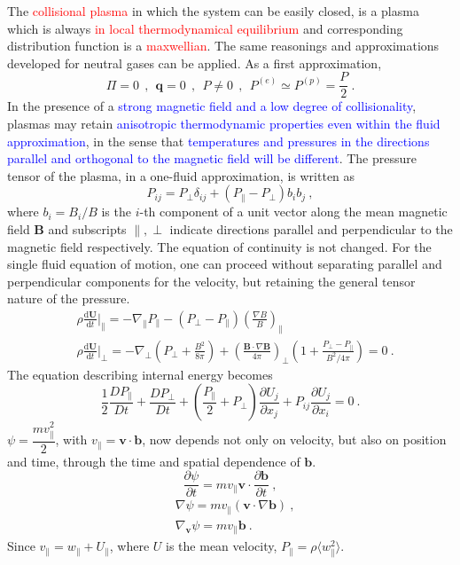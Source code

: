\documentclass[12pt,a4paper]{article}
\renewcommand{\vec}[1]{\boldsymbol{#1}}
\newcommand{\dif}{\mathrm{d}}
\begin{document}
The \textcolor{red}{collisional plasma} in which the system can be easily closed, is a plasma which is always \textcolor{red}{in local thermodynamical equilibrium} and corresponding distribution function is a \textcolor{red}{maxwellian}.  The same reasonings and approximations developed for neutral gases can be applied. As a first approximation, 
\begin{equation*}
\Pi   = 0 ~~ , ~~ \vec{q}  = 0 ~~, ~~ P \neq 0 ~~, ~~ P^{(e)} \simeq P^{(p)} = \frac{P}{2} ~.
\end{equation*}
In the presence of a \textcolor{blue}{strong magnetic field and a low degree of collisionality}, plasmas may retain \textcolor{blue}{anisotropic thermodynamic properties even within the fluid approximation}, in the sense that \textcolor{blue}{temperatures and pressures in the directions parallel and orthogonal to the magnetic field will be different}.  The pressure tensor of the plasma, in a one-fluid approximation, is written as
\begin{equation*}
P_{ij} = P_\perp \delta_{ij} +(P_\parallel -P_\perp) b_i b_j ~,
\end{equation*}
where $b_i = B_i /B$  is the $i$-th component of a unit vector along the mean magnetic field $\vec{B}$ and subscripts $\parallel, \perp$ indicate directions parallel and perpendicular to the magnetic field respectively. The equation of continuity is not changed. For the single fluid equation of motion, one can proceed without separating parallel and perpendicular components for the velocity, but retaining the general tensor nature of the pressure.
\begin{align*}
& \rho \frac{\dif \vec{U}}{\dif t}\Bigg|_\parallel = -\nabla_\parallel P_\parallel -(P_\perp -P_\parallel) \left(\frac{\nabla B}{B} \right)_\parallel \\
& \rho \frac{\dif \vec{U}}{\dif t}\Bigg|_\perp = -\nabla_\perp \left( P_\perp +\frac{B^2}{8\pi} \right) +\left(\frac{\vec{B}\cdot \nabla \vec{B}}{4\pi} \right)_\perp \left(1 +\frac{P_\perp -P_\parallel}{B^2/4\pi} \right) = 0 ~.
\end{align*}
The equation describing internal energy becomes
\begin{equation}
\frac{1}{2} \dfrac{D P_\parallel}{D t} +\dfrac{D P_\perp}{D t} +\left(\frac{P_\parallel}{2} +P_\perp \right) \frac{\partial U_j}{\partial x_j} +P_{ij} \frac{\partial U_j}{\partial x_i} = 0 ~.
\end{equation}
$\psi = \dfrac{m v^2_\parallel}{2}$, with $v_\parallel = \vec{v} \cdot \vec{b}$, now depends not only on velocity, but also on position and time, through the time and spatial dependence of $\vec{b}$. 
\begin{equation*}
\frac{\partial \psi}{\partial t} = m v_\parallel \vec{v} \cdot \frac{\partial \vec{b}}{\partial t} ~,
\end{equation*}
\begin{align*}
& \nabla \psi = m v_\parallel (\vec{v} \cdot \nabla \vec{b}) ~, \\
& \nabla_{\vec{v}} \psi = m v_\parallel \vec{b} ~.
\end{align*}
Since $v_\parallel = w_\parallel +U_\parallel$, where $U$ is the mean velocity, $P_\parallel = \rho \langle w_\parallel^2 \rangle$. 
\end{document}

